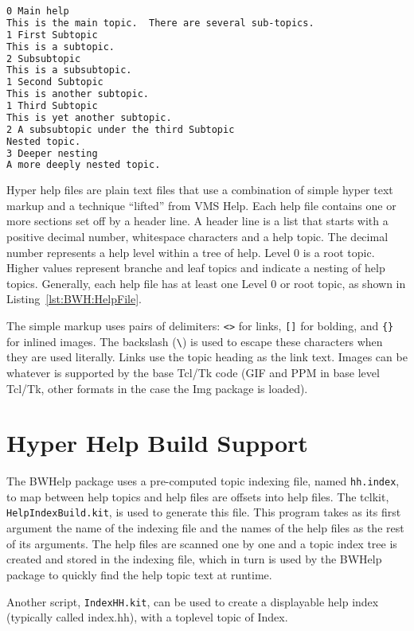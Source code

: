 \begin{lstlisting}[language=HTML,
		   caption={Typical help file},
		   label={lst:BWH:HelpFile}]
0 Main help
This is the main topic.  There are several sub-topics.
1 First Subtopic
This is a subtopic.
2 Subsubtopic
This is a subsubtopic.
1 Second Subtopic
This is another subtopic.
1 Third Subtopic
This is yet another subtopic.
2 A subsubtopic under the third Subtopic
Nested topic.
3 Deeper nesting
A more deeply nested topic.
\end{lstlisting}
Hyper help files are plain text files that use a combination of simple
hyper text markup and a technique ``lifted'' from VMS Help.  Each help
file contains one or more sections set off by a header line.  A header
line is a list that starts with a positive decimal number, whitespace
characters and a help topic.  The decimal number represents a help
level within a tree of help.  Level 0 is a root topic.  Higher values
represent branche and leaf topics and indicate a nesting of help topics.
Generally, each help file has at least one Level 0 or root topic, as
shown in Listing~\ref{lst:BWH:HelpFile}.

The simple markup uses pairs of delimiters: \verb=<>= for links,
\verb=[]= for bolding, and \verb={}= for inlined images.  The backslash
(\verb=\=) is used to escape these characters when they are used
literally.  Links use the topic heading as the link text.  Images can be
whatever is supported by the base Tcl/Tk code (GIF and PPM in base level
Tcl/Tk, other formats in the case the Img package is loaded).


\section{Hyper Help Build Support}
\label{sect:BWH:BuildIndex}

The BWHelp package uses a pre-computed topic indexing file, named
\verb=hh.index=, to map between help topics and help files are offsets
into help files.  The tclkit, \verb=HelpIndexBuild.kit=, is used to
generate this file.  This program takes as its first argument the name
of the indexing file and the names of the help files as the rest of its
arguments.  The help files are scanned one by one and a topic index tree is
created and stored in the indexing file, which in turn is used by the
BWHelp package to quickly find the help topic text at runtime.

Another script, \verb=IndexHH.kit=, can be used to create a displayable
help index (typically called index.hh), with a toplevel topic of Index.
